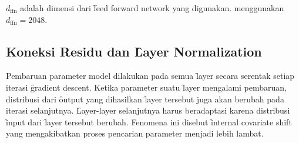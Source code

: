 	$d_{\text{ffn}}$ adalah dimensi dari \f{feed forward network} yang digunakan. \cite{transformerori} menggunakan $d_{\text{ffn}} = 2048$.

	\subsection{Koneksi Residu dan \f{Layer Normalization}}
	\label{sec:layer-normalization}

	Pembaruan parameter model dilakukan pada semua \f{layer} secara serentak setiap iterasi \f{gradient descent}. Ketika parameter suatu \f{layer} mengalami pembaruan, distribusi dari \f{output} yang dihasilkan \f{layer} tersebut juga akan berubah pada iterasi selanjutnya. \f{Layer-layer} selanjutnya harus beradaptasi karena distribusi \f{input} dari \f{layer} tersebut berubah. Fenomena ini disebut \f{internal covariate shift} yang mengakibatkan proses pencarian parameter menjadi lebih lambat.
	
